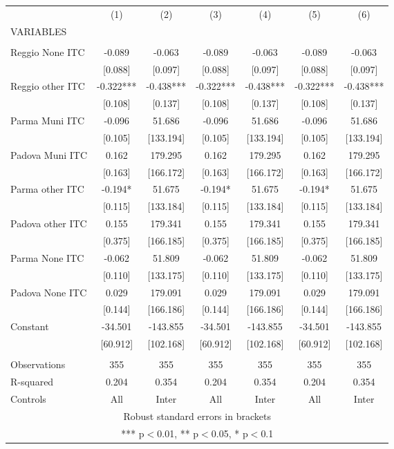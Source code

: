 \begin{tabular}{lcccccc} \hline
 & (1) & (2) & (3) & (4) & (5) & (6) \\
VARIABLES &  &  &  &  &  &  \\ \hline
 &  &  &  &  &  &  \\
Reggio None ITC & -0.089 & -0.063 & -0.089 & -0.063 & -0.089 & -0.063 \\
 & [0.088] & [0.097] & [0.088] & [0.097] & [0.088] & [0.097] \\
Reggio other ITC & -0.322*** & -0.438*** & -0.322*** & -0.438*** & -0.322*** & -0.438*** \\
 & [0.108] & [0.137] & [0.108] & [0.137] & [0.108] & [0.137] \\
Parma Muni ITC & -0.096 & 51.686 & -0.096 & 51.686 & -0.096 & 51.686 \\
 & [0.105] & [133.194] & [0.105] & [133.194] & [0.105] & [133.194] \\
Padova Muni ITC & 0.162 & 179.295 & 0.162 & 179.295 & 0.162 & 179.295 \\
 & [0.163] & [166.172] & [0.163] & [166.172] & [0.163] & [166.172] \\
Parma other ITC & -0.194* & 51.675 & -0.194* & 51.675 & -0.194* & 51.675 \\
 & [0.115] & [133.184] & [0.115] & [133.184] & [0.115] & [133.184] \\
Padova other ITC & 0.155 & 179.341 & 0.155 & 179.341 & 0.155 & 179.341 \\
 & [0.375] & [166.185] & [0.375] & [166.185] & [0.375] & [166.185] \\
Parma None ITC & -0.062 & 51.809 & -0.062 & 51.809 & -0.062 & 51.809 \\
 & [0.110] & [133.175] & [0.110] & [133.175] & [0.110] & [133.175] \\
Padova None ITC & 0.029 & 179.091 & 0.029 & 179.091 & 0.029 & 179.091 \\
 & [0.144] & [166.186] & [0.144] & [166.186] & [0.144] & [166.186] \\
Constant & -34.501 & -143.855 & -34.501 & -143.855 & -34.501 & -143.855 \\
 & [60.912] & [102.168] & [60.912] & [102.168] & [60.912] & [102.168] \\
 &  &  &  &  &  &  \\
Observations & 355 & 355 & 355 & 355 & 355 & 355 \\
R-squared & 0.204 & 0.354 & 0.204 & 0.354 & 0.204 & 0.354 \\
 Controls & All & Inter & All & Inter & All & Inter \\ \hline
\multicolumn{7}{c}{ Robust standard errors in brackets} \\
\multicolumn{7}{c}{ *** p$<$0.01, ** p$<$0.05, * p$<$0.1} \\
\end{tabular}
